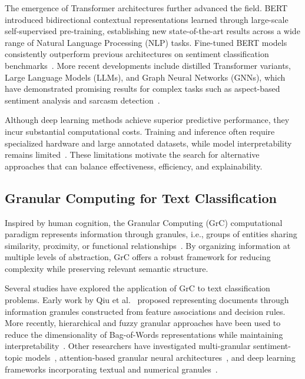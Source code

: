 \documentclass[a4paper,fleqn]{cas-dc}
\begin{document}
The emergence of Transformer architectures further advanced the field. BERT~\cite{Devlin2019bert} introduced bidirectional contextual representations learned through large-scale self-supervised pre-training, establishing new state-of-the-art results across a wide range of Natural Language Processing (NLP) tasks. Fine-tuned BERT models consistently outperform previous architectures on sentiment classification benchmarks~\cite{joshy2022analyzing}. More recent developments include distilled Transformer variants, Large Language Models (LLMs), and Graph Neural Networks (GNNs), which have demonstrated promising results for complex tasks such as aspect-based sentiment analysis and sarcasm detection~\cite{sharma2025review}.

Although deep learning methods achieve superior predictive performance, they incur substantial computational costs. Training and inference often require specialized hardware and large annotated datasets, while model interpretability remains limited~\cite{Li2017deep, strubell2019energy}. These limitations motivate the search for alternative approaches that can balance effectiveness, efficiency, and explainability.


\subsection{Granular Computing for Text Classification}

Inspired by human cognition, the Granular Computing (GrC) computational paradigm represents information through granules, i.e., groups of entities sharing similarity, proximity, or functional relationships~\cite{bargiela2003granular, Zadeh1997GrC}. By organizing information at multiple levels of abstraction, GrC offers a robust framework for reducing complexity while preserving relevant semantic structure.

Several studies have explored the application of GrC to text classification problems. Early work by Qiu et al.~\cite{qui2006GrC} proposed representing documents through information granules constructed from feature associations and decision rules. More recently, hierarchical and fuzzy granular approaches have been used to reduce the dimensionality of Bag-of-Words representations while maintaining interpretability~\cite{Liu2017fuzzy}. Other researchers have investigated multi-gra\-nu\-lar sentiment-topic models~\cite{Huang2022multigranular}, attention-based granular neural architectures~\cite{Li2020GrC}, and deep learning frameworks incorporating textual and numerical granules~\cite{Behzadidoost2024GrC}.
\end{document}
